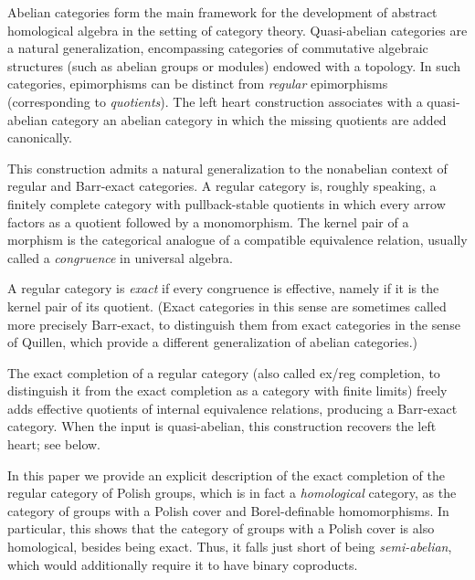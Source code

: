 \documentclass[12pt]{amsart}
\theoremstyle{definition}
\begin{document}
Abelian categories form the main framework for the development of abstract
homological algebra in the setting of category theory. Quasi-abelian
categories are a natural generalization, encompassing categories of
commutative algebraic structures (such as abelian groups or modules) endowed
with a topology. In such categories, epimorphisms can be distinct from \emph{%
regular} epimorphisms (corresponding to \emph{quotients}). The left heart
construction associates with a quasi-abelian category an abelian category in
which the missing quotients are added canonically.

This construction admits a natural generalization to the nonabelian context
of regular and Barr-exact categories. A regular category is, roughly
speaking, a finitely complete category with pullback-stable quotients in
which every arrow factors as a quotient followed by a monomorphism. The
kernel pair of a morphism is the categorical analogue of a compatible
equivalence relation, usually called a \emph{congruence} in universal
algebra.

A regular category is \emph{exact} if every congruence is effective, namely
if it is the kernel pair of its quotient. (Exact categories in this sense
are sometimes called more precisely Barr-exact, to distinguish them from
exact categories in the sense of Quillen, which provide a different
generalization of abelian categories.)

The exact completion of a regular category (also called ex/reg completion,
to distinguish it from the exact completion as a category with finite
limits) freely adds effective quotients of internal equivalence relations,
producing a Barr-exact category. When the input is quasi-abelian, this
construction recovers the left heart; see  below.

In this paper we provide an explicit description of the exact completion of
the regular category of Polish groups, which is in fact a \emph{homological}
category, as the category of groups with a Polish cover and Borel-definable
homomorphisms. In particular, this shows that the category of groups with a
Polish cover is also homological, besides being exact. Thus, it falls just
short of being \emph{semi-abelian}, which would additionally require it to
have binary coproducts.
\end{document}
